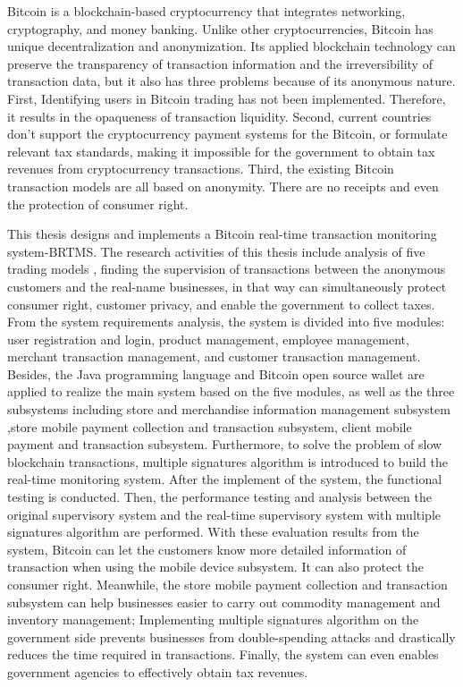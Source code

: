\begin{eabstract}
	Bitcoin is a blockchain-based cryptocurrency that integrates networking, cryptography, and money banking. Unlike other cryptocurrencies, Bitcoin has unique decentralization and anonymization. Its applied blockchain technology can preserve the transparency of transaction information and the irreversibility of transaction data, but it also has three problems because of its anonymous nature. First, Identifying users in Bitcoin trading has not been implemented. Therefore, it results in the opaqueness of transaction liquidity. Second, current countries don't support the cryptocurrency payment systems for the Bitcoin, or formulate relevant tax standards, making it impossible for the government to obtain tax revenues from cryptocurrency transactions. Third, the existing Bitcoin transaction models are all based on anonymity. There are no receipts and even the protection of consumer right.

	This thesis designs and implements a Bitcoin real-time transaction monitoring system-BRTMS. The research activities of this thesis include analysis of five trading models , finding the supervision of transactions between the anonymous customers and the real-name businesses, in that way can simultaneously protect consumer right, customer privacy, and enable the government to collect taxes. From the system requirements analysis, the system is divided into five modules: user registration and login, product management, employee management, merchant transaction management, and customer transaction management. Besides, the Java programming language and Bitcoin open source wallet are applied to realize the main system based on the five modules, as well as the three subsystems including store and merchandise information management subsystem ,store mobile payment collection and transaction subsystem, client mobile payment and transaction subsystem. Furthermore, to solve the problem of slow blockchain transactions, multiple signatures algorithm is introduced to build the real-time monitoring system. After the implement of the system, the functional testing is conducted. Then, the performance testing and analysis between the original supervisory system and the real-time supervisory system with multiple signatures algorithm are performed. With these evaluation results from the system, Bitcoin can let the customers know  more detailed information of transaction when using the mobile device subsystem. It can also protect the consumer right. Meanwhile, the store mobile payment collection and transaction subsystem can help businesses easier to carry out commodity management and inventory management; Implementing multiple signatures algorithm on the government side prevents businesses from double-spending attacks and drastically reduces the time required in transactions. Finally, the system can even enables government agencies to effectively obtain tax revenues.


\end{eabstract}

